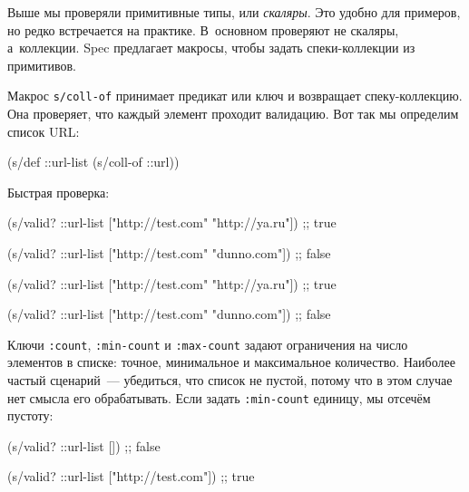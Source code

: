 Выше мы проверяли примитивные типы, или \emph{скаляры}. Это удобно для примеров,
но редко встречается на практике. В~основном проверяют не скаляры,
а~коллекции. Spec предлагает макросы, чтобы задать спеки-коллекции из
примитивов.


Макрос \verb|s/coll-of| принимает предикат или ключ и возвращает
спеку-коллекцию. Она проверяет, что каждый элемент проходит валидацию. Вот так
мы определим список URL:

\begin{english}
  \begin{clojure}
(s/def ::url-list (s/coll-of ::url))
  \end{clojure}
\end{english}

\noindent
Быстрая проверка:

\ifx\DEVICETYPE\MOBILE

\begin{english}
  \begin{clojure}
(s/valid? ::url-list
  ["http://test.com" "http://ya.ru"])
;; true

(s/valid? ::url-list
  ["http://test.com" "dunno.com"])
;; false
  \end{clojure}
\end{english}

\else

\begin{english}
  \begin{clojure}
(s/valid? ::url-list ["http://test.com" "http://ya.ru"])
;; true

(s/valid? ::url-list ["http://test.com" "dunno.com"])
;; false
  \end{clojure}
\end{english}

\fi

Ключи \verb|:count|, \verb|:min-count| и \verb|:max-count| задают ограничения на
число элементов в списке: точное, минимальное и максимальное
количество. Наиболее частый сценарий~--- убедиться, что список не пустой, потому
что в этом случае нет смысла его обрабатывать. Если задать \verb|:min-count|
единицу, мы отсечём пустоту:

\begin{english}
  \begin{clojure}
(s/valid? ::url-list [])
;; false

(s/valid? ::url-list ["http://test.com"])
;; true
  \end{clojure}
\end{english}

